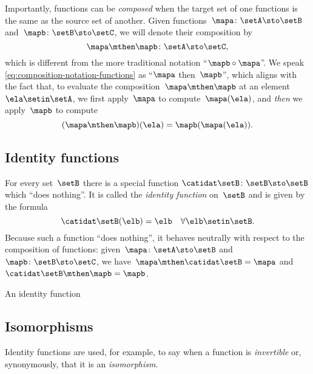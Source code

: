 Importantly, functions can be \emph{composed} when the target set of one functions is the same as the source set of another.
Given functions~$\mapa\colon \setA \sto \setB$ and~$\mapb \colon \setB \sto \setC$, we will denote their composition by
\begin{equation}
    \label{eq:composition-notation-functions}
    \mapa \mthen \mapb \colon \setA \sto \setC,
\end{equation}
which is different from the more traditional notation ``$\mapb \circ \mapa$''.
We speak \cref{eq:composition-notation-functions} as ``$\mapa$ then~$\mapb$'', which aligns with the fact that, to evaluate the composition~$\mapa \mthen \mapb$ at an element~$\ela \setin\setA$, we first apply~$\mapa$ to compute~$\mapa(\ela)$, and \emph{then} we apply~$\mapb$ to compute
\begin{equation}
    (\mapa \mthen \mapb)(\ela)
    = \mapb(\mapa(\ela)).
\end{equation}

\subsection{Identity functions}

For every set~$\setB$ there is a special function $\catidat\setB \colon \setB \sto \setB$ which ``does nothing''.
It is called the \emph{identity function} on~$\setB$ and is given by the formula
\begin{equation}
    \catidat\setB(\elb) = \elb \quad \forall  \elb \setin\setB.
\end{equation}
Because such a function ``does nothing'', it behaves neutrally with respect to the composition of functions: given~$\mapa \colon \setA \sto \setB$ and~$\mapb \colon \setB \sto \setC$, we have~$\mapa \mthen \catidat\setB = \mapa$ and~$\catidat\setB \mthen \mapb = \mapb$.

\begin{marginfigure}
    \centering
    \caption{An identity function}
    \label{fig:identity-function}
\end{marginfigure}

\subsection{Isomorphisms}

Identity functions are used, for example, to say when a function is \emph{invertible} or, synonymously, that it is an \emph{isomorphism}.

